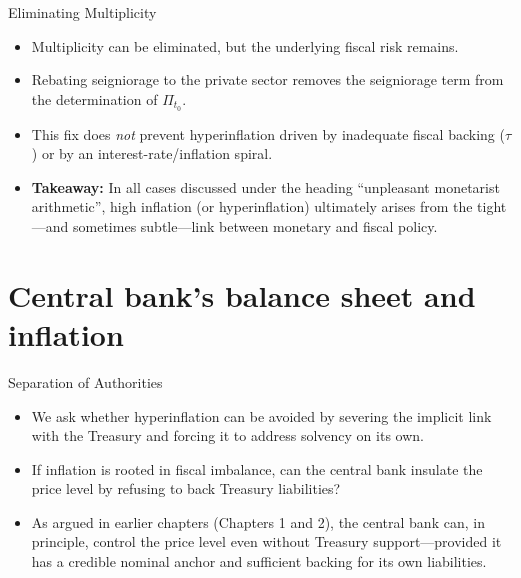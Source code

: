 \documentclass[11pt,aspectratio=169]{beamer}
\begin{document}
\begin{frame}{Eliminating Multiplicity}
\small
\begin{itemize}
    \item Multiplicity can be eliminated, but the underlying fiscal risk remains.
    \item Rebating seigniorage to the private sector removes the seigniorage term from the determination of \(\Pi_{t_0}\).
    \item This fix does \emph{not} prevent hyperinflation driven by inadequate fiscal backing (\(\tau\)) or by an interest-rate/inflation spiral.
    \item \textbf{Takeaway:} In all cases discussed under the heading \enquote{unpleasant monetarist arithmetic}, high inflation (or hyperinflation) ultimately arises from the tight—and sometimes subtle—link between monetary and fiscal policy.
\end{itemize}
\end{frame}

\section{Central bank's balance sheet and inflation}
\label{Ch12-BS}

\begin{frame}{Separation of Authorities}
\small
\begin{itemize}
    \item We ask whether hyperinflation can be avoided by severing the implicit link with the Treasury and forcing it to address solvency on its own.
    \item If inflation is rooted in fiscal imbalance, can the central bank insulate the price level by refusing to back Treasury liabilities?
    \item As argued in earlier chapters (Chapters 1 and 2), the central bank can, in principle, control the price level even without Treasury support—provided it has a credible nominal anchor and sufficient backing for its own liabilities.
\end{itemize}
\end{frame}
\end{document}
